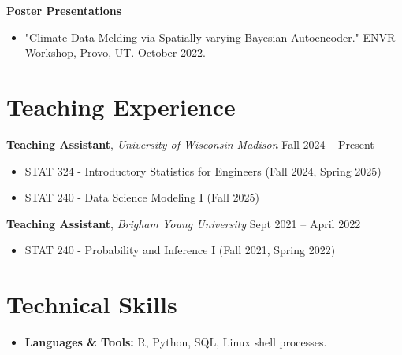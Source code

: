 \documentclass[11pt, letterpaper]{article}
\begin{document}
\vspace{4pt}
\textbf{Poster Presentations}
\begin{itemize}
    \item "Climate Data Melding via Spatially varying Bayesian Autoencoder." ENVR Workshop, Provo, UT. October 2022.
\end{itemize}

\section{Teaching Experience}
\textbf{Teaching Assistant}, \textit{University of Wisconsin-Madison} \hfill Fall 2024 -- Present
\begin{itemize}
    \item STAT 324 - Introductory Statistics for Engineers (Fall 2024, Spring 2025)
    \item STAT 240 - Data Science Modeling I (Fall 2025)
\end{itemize}

\vspace{4pt}
\textbf{Teaching Assistant}, \textit{Brigham Young University} \hfill Sept 2021 -- April 2022
\begin{itemize}
    \item STAT 240 - Probability and Inference I (Fall 2021, Spring 2022)
\end{itemize}

\section{Technical Skills}
\begin{itemize}
    \item \textbf{Languages \& Tools:} R, Python, SQL, Linux shell processes.
\end{itemize}
\end{document}
